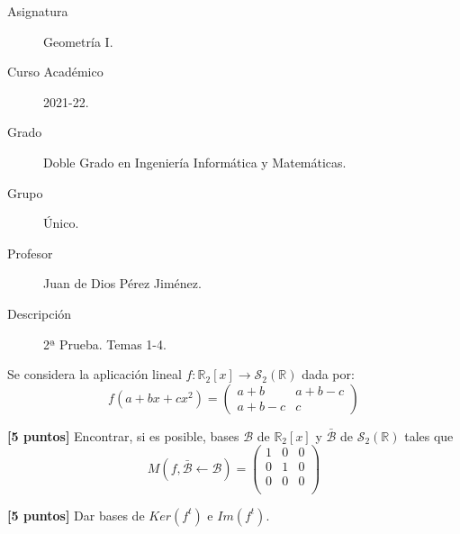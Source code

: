 \documentclass[12pt]{article}
\begin{document}

    
    

    \begin{description}
        \item[Asignatura] Geometría I.
        \item[Curso Académico] 2021-22.
        \item[Grado] Doble Grado en Ingeniería Informática y Matemáticas.
        \item[Grupo] Único.
        \item[Profesor] Juan de Dios Pérez Jiménez.
        \item[Descripción] 2ª Prueba. Temas 1-4.
    
    \end{description}
    \newpage
    

    Se considera la aplicación lineal $\displaystyle f:\mathbb{R}_2[x] \longrightarrow \mathcal{S}_2(\mathbb{R})$ dada por:
    \begin{equation*}
        f(a+bx+cx^2) = \left( \begin{array}{cc}
            a+b & a+b-c \\
            a+b-c & c
        \end{array}\right)
    \end{equation*}


    \begin{ejercicio}\textbf{[5 puntos]}
        Encontrar, si es posible, bases $\mathcal{B}$ de $\mathbb{R}_2[x]$ y $\mathcal{\bar{B}}$ de $\mathcal{S}_2(\mathbb{R})$ tales que
        \begin{equation*}
        M(f, \mathcal{\bar{B}} \longleftarrow \mathcal{B}) = \left( \begin{array}{ccc}
            1 & 0 & 0 \\
            0 & 1 & 0 \\
            0 & 0 & 0 \\
        \end{array}\right)
        \end{equation*}
    \end{ejercicio}

    \begin{ejercicio}
        \textbf{[5 puntos]} Dar bases de $Ker(f^t)$ e $Im(f^t)$.
    \end{ejercicio}
\end{document}
